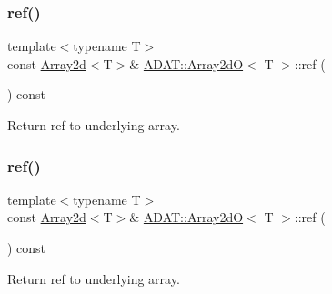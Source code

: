 \mbox{\label{classADAT_1_1Array2dO_a376d2e36985a9c05e09bd33244865997}} 
\subsubsection{\texorpdfstring{ref()}{ref()}\hspace{0.1cm}{\footnotesize\ttfamily [1/4]}}
{\footnotesize\ttfamily template$<$typename T$>$ \\
const \mbox{\hyperlink{classXMLArray_1_1Array2d}{Array2d}}$<$T$>$\& \mbox{\hyperlink{classADAT_1_1Array2dO}{A\+D\+A\+T\+::\+Array2dO}}$<$ T $>$\+::ref (\begin{DoxyParamCaption}{ }\end{DoxyParamCaption}) const\hspace{0.3cm}{\ttfamily [inline]}}



Return ref to underlying array. 

\mbox{\label{classADAT_1_1Array2dO_a376d2e36985a9c05e09bd33244865997}} 
\subsubsection{\texorpdfstring{ref()}{ref()}\hspace{0.1cm}{\footnotesize\ttfamily [2/4]}}
{\footnotesize\ttfamily template$<$typename T$>$ \\
const \mbox{\hyperlink{classXMLArray_1_1Array2d}{Array2d}}$<$T$>$\& \mbox{\hyperlink{classADAT_1_1Array2dO}{A\+D\+A\+T\+::\+Array2dO}}$<$ T $>$\+::ref (\begin{DoxyParamCaption}{ }\end{DoxyParamCaption}) const\hspace{0.3cm}{\ttfamily [inline]}}



Return ref to underlying array. 

\mbox{\label{classADAT_1_1Array2dO_aa409325aa8f61b6f9a6aeeca2746b4cb}} 
